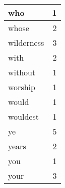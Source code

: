 \begin{center}
\begin{longtable}{l|r}
who & 1 \\ \hline
whose & 2 \\ \hline
wilderness & 3 \\ \hline
with & 2 \\ \hline
without & 1 \\ \hline
worship & 1 \\ \hline
would & 1 \\ \hline
wouldest & 1 \\ \hline
ye & 5 \\ \hline
years & 2 \\ \hline
you & 1 \\ \hline
your & 3 \\ \hline
\end{longtable}
\end{center}



\normalsize




